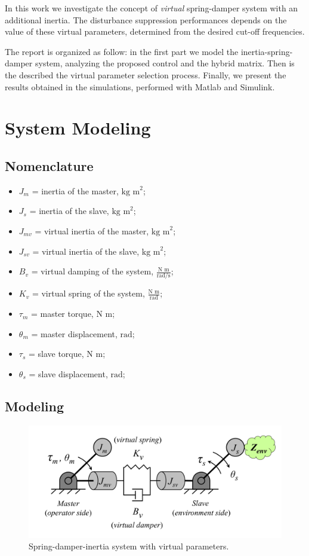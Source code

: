 In this work we investigate the concept of \textit{virtual} spring-damper system with an additional inertia.
The disturbance suppression performances depends on the value of these virtual parameters, determined from the desired cut-off frequencies.

The report is organized as follow: in the first part we model the inertia-spring-damper system, analyzing the proposed control and the hybrid matrix. Then is the described the virtual parameter selection process. Finally, we present the results obtained in the simulations, performed with Matlab and Simulink.

\section{System Modeling}

\subsection*{Nomenclature}

\begin{itemize}
	\item $ J_m $ = inertia of the master, $ \text{kg m}^2 $;
	\item $ J_s $ = inertia of the slave,  $ \text{kg m}^2 $;
	\item $ J_{mv} $ = virtual inertia of the master,  $ \text{kg m}^2 $;
	\item $ J_{sv} $ = virtual inertia of the slave,  $ \text{kg m}^2 $;
	\item $ B_v $ = virtual damping of the system, $ \frac{\text{N m}}{\text{rad/s}} $;
	\item $ K_v $ = virtual spring of the system, $ \frac{\text{N m}}{\text{rad}} $;
	\item $ \tau_m $ = master torque, $ \text{N m} $;
	\item $ \theta_m $ = master displacement, $ \text{rad} $; 
	\item $ \tau_s $ = slave torque, $ \text{N m} $;
	\item $ \theta_s $ = slave displacement, $ \text{rad} $;
\end{itemize}

\subsection{Modeling}

\begin{figure}[h]
	\centering
	\includegraphics[width=0.7\linewidth]{Images/spring_damper_inertia_system}
	\caption{Spring-damper-inertia system with virtual parameters.}
	\label{fig:springdamperinertiasystem}
\end{figure}


